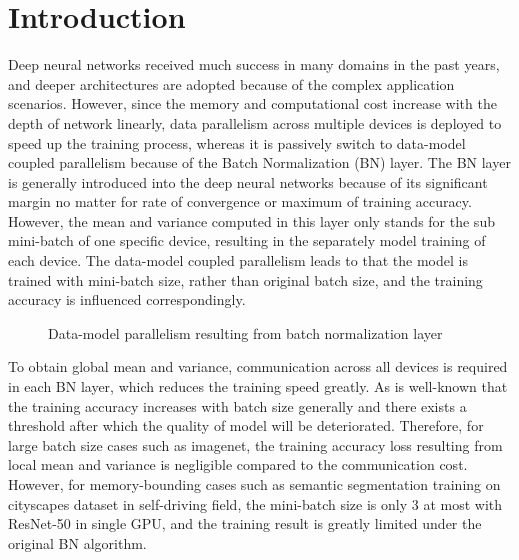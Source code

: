 \section{Introduction}

Deep neural networks received much success in many domains in the past years, and deeper architectures are adopted because of the complex application scenarios. However, since the memory and computational cost increase with the depth of network linearly, data parallelism across multiple devices is deployed to speed up the training process, whereas it is passively switch to data-model coupled parallelism because of the Batch Normalization (BN) layer\cite{ioffe2015batch}. The BN layer is generally introduced into the deep neural networks because of its significant margin no matter for rate of convergence or maximum of training accuracy. However, the mean and variance computed in this layer only stands for the sub mini-batch of one specific device, resulting in the separately model training of each device. The data-model coupled parallelism leads to that the model is trained with mini-batch size, rather than original batch size, and the training accuracy is influenced correspondingly.

\begin{figure}[b]
    \begin{center}
    \caption{Data-model parallelism resulting from batch normalization layer}%
    \label{fig:localBN}
    \end{center}
    \end{figure}

To obtain global mean and variance, communication across all devices is required in each BN layer, which reduces the training speed greatly. As is well-known that the training accuracy increases with batch size generally and there exists a threshold after which the quality of model will be deteriorated\cite{keskar2016large}. Therefore, for large batch size cases such as imagenet\cite{krizhevsky2012imageneti}, the training accuracy loss resulting from local mean and variance is negligible compared to the communication cost. However, for memory-bounding cases such as semantic segmentation training on cityscapes dataset in self-driving field, the mini-batch size is only 3 at most with ResNet-50 in single GPU, and the training result is greatly limited under the original BN algorithm.


